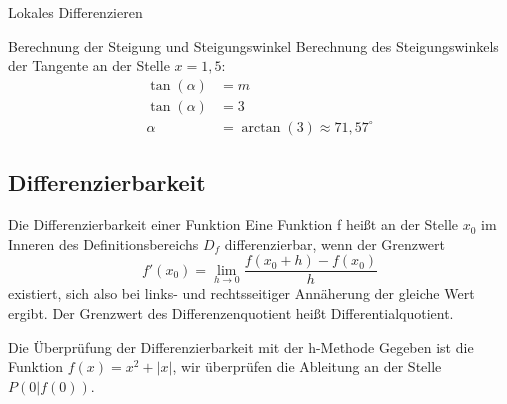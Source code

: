 \begin{section}{Lokales Differenzieren}
\begin{bsp*}{Berechnung der Steigung und Steigungswinkel}{}
Berechnung des Steigungswinkels der Tangente an der Stelle $x=1,5 $: 
\begin{equation*}
\begin{split}
\tan{(\alpha)} &= m\\
\tan{(\alpha)} &= 3\\
\alpha &= \arctan{(3)} \approx 71,57^{\circ}  
\end{split}
\end{equation*}
\end{bsp*}
\subsection{Differenzierbarkeit} 
\begin{defi}{Die Differenzierbarkeit einer Funktion}{}
 Eine Funktion f heißt an der Stelle $x_0$ im Inneren des Definitionsbereichs $D_f$ differenzierbar, wenn der Grenzwert \begin{equation*}
     f'(x_0) =\lim_{h\rightarrow 0}\dfrac{f(x_0 +h) -f(x_0)}{h}
 \end{equation*} existiert, sich also bei links- und rechtsseitiger Annäherung der gleiche Wert ergibt. Der Grenzwert des Differenzenquotient heißt Differentialquotient.
\end{defi}
\begin{bsp*}{Die Überprüfung der Differenzierbarkeit mit der h-Methode}
    Gegeben ist die Funktion $f(x)= x^2 + |x|$, wir überprüfen die Ableitung an der Stelle $P(0|f(0))$.


\end{bsp*}
\end{section}

